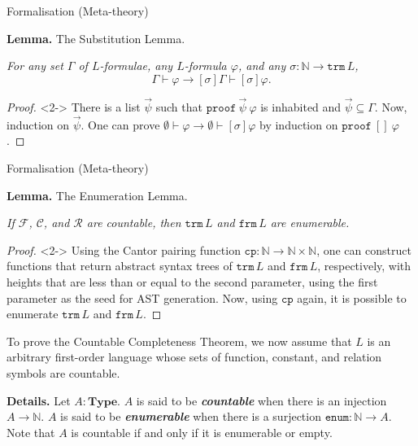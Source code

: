 \documentclass[serif,table,10pt]{beamer}
\newcommand{\IN}{\mathbb{N}}
\newcommand{\0}{\texttt{0}}
\newcommand{\1}{\texttt{1}}
\newcommand{\inlinedef}[1]{\emph{\textbf{#1}}}
\newcommand{\Type}{\mathbf{Type}}
\newcommand{\proves}[2]{\mathtt{proof}\ #1\ #2 }
\begin{document}
\begin{frame}{Formalisation (Meta-theory)}

    \textbf{Lemma.} The Substitution Lemma.
    
    \emph{For any set $\Gamma$ of $L$-formulae, any $L$-formula $\varphi$, and any $\sigma : \IN \to \mathtt{trm} \, L$, \[ \Gamma \vdash \varphi \to [\sigma] \Gamma \vdash [\sigma] \varphi . \]}

    \begin{proof}<2->
        There is a list $\vec\psi$ such that $\proves{\vec\psi}{\varphi}$ is inhabited and $\vec\psi \subseteq \Gamma$. Now, induction on  $\vec\psi$. One can prove $ \emptyset \vdash \varphi \to \emptyset \vdash [ \sigma ] \varphi $ by induction on $\proves{[]}{\varphi}$.
    \end{proof}

\end{frame}

\begin{frame}{Formalisation (Meta-theory)}

    \textbf{Lemma.} The Enumeration Lemma.

    \begin{center}
        \emph{If $\mathcal{F}$, $\mathcal{C}$, and $\mathcal{R}$ are countable, then $\mathtt{trm} \, L$ and $\mathtt{frm} \, L$ are enumerable.}
    \end{center}

    \begin{proof}<2->
        Using the Cantor pairing function $\mathtt{cp} : \IN \to \IN \times \IN $, one can construct functions that return abstract syntax trees of $\mathtt{trm} \, L$ and $\mathtt{frm} \, L$, respectively, with heights that are less than or equal to the second parameter, using the first parameter as the seed for AST generation.
        Now, using $\mathtt{cp}$ again, it is possible to enumerate $\mathtt{trm} \, L$ and $\mathtt{frm} \, L$.
    \end{proof}

    To prove the Countable Completeness Theorem, we now assume that $L$ is an arbitrary first-order language whose sets of function, constant, and relation symbols are countable.

    \textbf{Details.}
    Let $A : \Type$. $A$ is said to be \inlinedef{countable} when there is an injection $A \to \IN$. $A$ is said to be \inlinedef{enumerable} when there is a surjection $\mathtt{enum} : \IN \to A$. Note that $A$ is countable if and only if it is enumerable or empty.

\end{frame}
\end{document}
